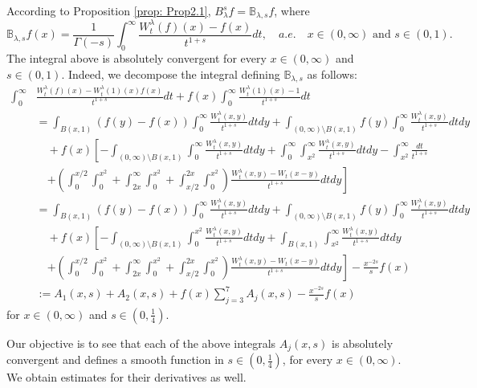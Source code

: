 \documentclass[a4paper,10pt, reqno]{amsart}
\theoremstyle{definition}
\theoremstyle{remark}
\numberwithin{equation}{section}
\begin{document}
According to Proposition \ref{prop: Prop2.1}, $B_\lambda^sf=\mathbb B_{\lambda ,s}f$, where
\[
\mathbb B_{\lambda ,s}f(x)=\frac{1}{\Gamma (-s)}\int_0^\infty \frac{W_t^\lambda (f)(x)-f(x)}{t^{1+s}}dt,\quad a.e.\quad x\in (0,\infty)\mbox{ and }s\in (0,1).
\]
The integral above is absolutely convergent for every $x\in (0,\infty)$ and $s\in (0,1)$. Indeed, we decompose the integral defining $\mathbb B_{\lambda ,s}$ as follows:
\begin{align}\label{eq: decomposition mbbB lambda s}
   \int_0^\infty &\frac{W_t^\lambda (f)(x)-W_t^\lambda (1)(x)f(x)}{t^{1+s}}dt+f(x)\int_0^\infty \frac{W_t^\lambda (1)(x)-1}{t^{1+s}}dt\nonumber\\
    &= \int_{B(x,1)}(f(y)-f(x))\int_0^\infty  \frac{W_t^\lambda (x,y)}{t^{1+s}}dtdy+\int_{(0,\infty)\setminus B(x,1)}f(y)\int_0^\infty \frac{W_t^\lambda (x,y)}{t^{1+s}}dtdy\nonumber\\
    &\quad +f(x)\left[-\int_{(0,\infty)\setminus B(x,1)}\int_0^\infty \frac{W_t^\lambda (x,y)}{t^{1+s}}dtdy+\int_0^\infty \int_{x^2}^\infty \frac{W_t^\lambda (x,y)}{t^{1+s}}dtdy-\int_{x^2}^\infty \frac{dt}{t^{1+s}}\right.\nonumber\\
    &\quad \left.+\left(\int_0^{x/2}\int_0^{x^2}+\int_{2x}^\infty \int_0^{x^2}+\int_{x/2}^{2x}\int_0^{x^2}\right)\frac{W_t^\lambda (x,y)-W_t(x-y)}{t^{1+s}}dtdy\right]\nonumber\\
     &=\int_{B(x,1)}(f(y)-f(x))\int_0^\infty  \frac{W_t^\lambda (x,y)}{t^{1+s}}dtdy+\int_{(0,\infty)\setminus B(x,1)}f(y)\int_0^\infty \frac{W_t^\lambda (x,y)}{t^{1+s}}dtdy\nonumber\\
    &\quad +f(x)\left[-\int_{(0,\infty)\setminus B(x,1)}\int_0^{x^2} \frac{W_t^\lambda (x,y)}{t^{1+s}}dtdy+\int_{B(x,1)}\int_{x^2}^\infty \frac{W_t^\lambda (x,y)}{t^{1+s}}dtdy\right.\nonumber\\
    &\quad \left.+\left(\int_0^{x/2}\int_0^{x^2}+\int_{2x}^\infty \int_0^{x^2}+\int_{x/2}^{2x}\int_0^{x^2}\right)\frac{W_t^\lambda (x,y)-W_t(x-y)}{t^{1+s}}dtdy\right]-\frac{x^{-2s}}{s}f(x)\nonumber\\
    &:=A_1(x,s)+A_2(x,s)+f(x)\sum_{j=3}^7 A_j(x,s)-\frac{x^{-2s}}{s}f(x)
\end{align}
for $x\in (0,\infty)$  and $s\in \left(0,\tfrac{1}{4}\right).$ 

Our objective is to see that each of the above integrals $A_j(x,s)$ is absolutely convergent and defines a smooth function in $s\in (0,\tfrac14)$, for every $x\in (0,\infty)$. We obtain estimates for their derivatives as well.
\end{document}

